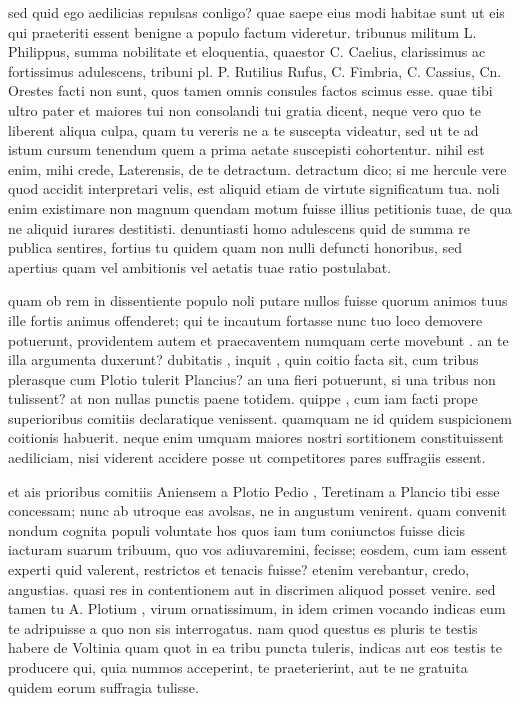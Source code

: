  sed quid ego aedilicias repulsas conligo? quae saepe eius modi habitae sunt ut eis qui praeteriti essent benigne a populo factum videretur. tribunus militum L. Philippus, summa nobilitate et eloquentia, quaestor C. Caelius, clarissimus ac fortissimus adulescens, tribuni pl. P. Rutilius Rufus, C. Fimbria, C. Cassius, Cn. Orestes facti non sunt, quos tamen omnis consules factos scimus esse. quae tibi ultro pater et maiores tui non consolandi tui gratia dicent, neque vero quo te liberent aliqua culpa, quam tu vereris ne a te suscepta videatur, sed ut te ad istum cursum tenendum quem a prima aetate suscepisti cohortentur. nihil est enim, mihi crede, Laterensis, de te detractum. detractum dico; si me hercule vere quod accidit interpretari velis, est aliquid etiam de virtute significatum tua. noli enim existimare non magnum quendam motum fuisse illius petitionis tuae, de qua ne aliquid iurares destitisti. denuntiasti homo adulescens quid de summa re publica sentires, fortius tu quidem quam non nulli defuncti honoribus, sed apertius quam vel ambitionis vel aetatis tuae ratio postulabat.

 quam ob rem in dissentiente populo noli putare nullos fuisse quorum animos tuus ille fortis animus offenderet; qui te incautum fortasse nunc tuo loco demovere potuerunt, providentem autem et praecaventem numquam certe movebunt . an te illa argumenta duxerunt? dubitatis , inquit , quin coitio facta sit, cum tribus plerasque cum Plotio tulerit Plancius? an una fieri potuerunt, si una tribus non tulissent? at non nullas punctis paene totidem. quippe , cum iam facti prope superioribus comitiis declaratique venissent. quamquam ne id quidem suspicionem coitionis habuerit. neque enim umquam maiores nostri sortitionem constituissent aediliciam, nisi viderent accidere posse ut competitores pares suffragiis essent.

 et ais prioribus comitiis Aniensem a Plotio Pedio , Teretinam a Plancio tibi esse concessam; nunc ab utroque eas avolsas, ne in angustum venirent. quam convenit nondum cognita populi voluntate hos quos iam tum coniunctos fuisse dicis iacturam suarum tribuum, quo vos adiuvaremini, fecisse; eosdem, cum iam essent experti quid valerent, restrictos et tenacis fuisse? etenim verebantur, credo, angustias. quasi res in contentionem aut in discrimen aliquod posset venire. sed tamen tu A. Plotium , virum ornatissimum, in idem crimen vocando indicas eum te adripuisse a quo non sis interrogatus. nam quod questus es pluris te testis habere de Voltinia quam quot in ea tribu puncta tuleris, indicas aut eos testis te producere qui, quia nummos acceperint, te praeterierint, aut te ne gratuita quidem eorum suffragia tulisse.

